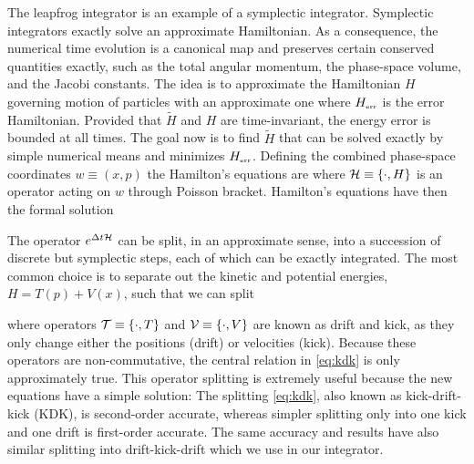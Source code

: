 The leapfrog integrator is an example of a symplectic integrator. Symplectic integrators exactly solve an approximate Hamiltonian. As a consequence, the numerical time evolution is a canonical map and preserves certain conserved quantities exactly, such as the total angular momentum, the phase-space volume, and the Jacobi constants. The idea is to approximate the Hamiltonian \(H\) governing motion of particles with an approximate one
where \(H_\text{\tiny err}\) is the error Hamiltonian. Provided that \(\tilde H\) and \(H\) are time-invariant, the energy error is bounded at all times. The goal now is to find \(\tilde H\) that can be solved exactly by simple numerical means and minimizes \(H_\text{\tiny err}\). Defining the combined phase-space coordinates \(w\equiv(x,p)\) the Hamilton's equations are
where \(\mathcal{H}\equiv\{\cdot,H\}\) is an operator acting on \(w\) through Poisson bracket. Hamilton’s equations have then the formal solution
\begin{sloppypar}
The operator \(e^{\Delta t\mathcal{H}}\) can be split, in an approximate sense, into a succession of discrete but symplectic steps, each of which can be exactly integrated. The most common choice is to separate out the kinetic and potential energies, \({H=T(p)+V(x)}\), such that we can split
\end{sloppypar}
where operators \(\mathcal{T}\equiv\{\cdot,T\}\) and \(\mathcal{V}\equiv\{\cdot,V\}\) are known as drift and kick, as they only change either the positions (drift) or velocities (kick). Because these operators are non-commutative, the central relation in \eqref{eq:kdk} is only approximately true. This operator splitting is extremely useful because the new equations have a simple solution:
The splitting \eqref{eq:kdk}, also known as kick-drift-kick (KDK), is second-order accurate, whereas simpler splitting only into one kick and one drift is first-order accurate. The same accuracy and results have also similar splitting into drift-kick-drift which we use in our integrator.
